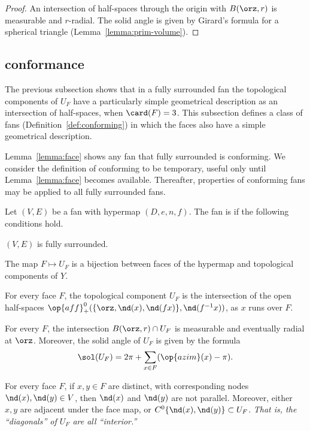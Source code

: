 \begin{proof} An intersection of half-spaces through the origin 
with $B(\orz,r)$ is measurable and
$r$-radial.  The solid angle is given by Girard's formula for
a spherical triangle (Lemma~\ref{lemma:prim-volume}).
\end{proof}
%

\subsection{conformance}\label{sec:conformance}


The previous subsection shows that in a fully surrounded fan the topological
components of $U_F$ have a particularly simple geometrical description as
an intersection of half-spaces, when $\card(F)=3$.  This subsection defines
a class of fans (Definition~\ref{def:conforming}) in which the faces also have
a  simple geometrical description.

Lemma~\ref{lemma:face} shows any fan that fully surrounded is
conforming.  We consider the definition of conforming to be temporary,
useful only until Lemma~\ref{lemma:face} becomes available.
Thereafter, properties of conforming fans may be applied to all fully
surrounded fans.

\begin{definition}[conforming]\label{def:conforming}
Let $(V,E)$ be a fan with hypermap $(D,e,n,f)$.  The fan is
 if the following conditions hold.
\begin{nomerate}
\item {} $(V,E)$ is fully surrounded.
\item {} The map $F\mapsto U_F$ is a bijection between
faces of the hypermap and topological components of $Y$.
\item {} For every face $F$, the topological component
$U_F$ is the intersection of the open half-spaces
$\op{aff}_+^0(\{\orz,\nd(x),\nd({f x})\},\nd(f^{-1} x))$, as $x$ runs over
$F$.
\item {} For every $F$, the intersection
$B(\orz,r)\cap U_F$ is measurable and eventually radial at $\orz$.
Moreover, the solid angle of $U_F$ is given by the formula
\begin{displaymath}
\sol(U_F) = 2\pi + \sum_{x\in F}(\op{azim}(x)-\pi).
\end{displaymath}
\item {} For every face $F$, if $x,y\in F$ are distinct,
with corresponding nodes $\nd(x),\nd(y)\in V$, then $\nd(x)$ and
$\nd(y)$ are not parallel.  Moreover, either $x,y$ are adjacent under
the face map, or $C^0\{\nd(x),\nd(y)\}\subset U_F$.  {\it That is, the
``diagonals'' of $U_F$ are all ``interior.''}
\end{nomerate}
\end{definition}


